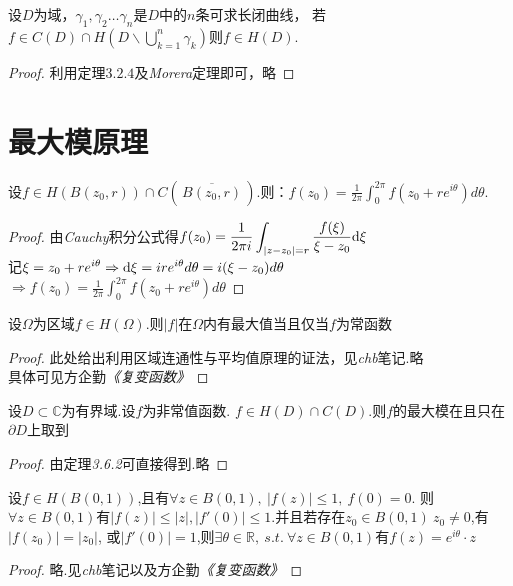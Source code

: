 \begin{eg}
	设$D$为域，$\gamma_1,\gamma_2\dots \gamma_n$是$D$中的$n$条可求长闭曲线，
	若$\displaystyle{f\in C(D)\cap H(D\backslash \mathop{\bigcup}\limits_{k=1}^{n}\gamma_k)}$则$f\in H(D)$.
\end{eg}
\begin{proof}
	利用定理$3.2.4$及\emph{Morera}定理即可，略
\end{proof}

\section{最大模原理}
\begin{mypro}[平均值定理]
	设$f\in H(B(z_0,r))\cap C(\,\overline{B(z_0,r)}\,)$.则：$\displaystyle{f(z_0)=\frac{1}{2\pi}\int_0^{2\pi}f(z_0+re^{i\theta})d\theta}$.
\end{mypro}
\begin{proof}
	由\emph{Cauchy}积分公式得$\displaystyle{f(z_0)=\frac{1}{2\pi i}\int_{|z-z_0|=r}\frac{f(\xi)}{\xi-z_0}\mathrm{d}\xi}$\\
	记$\displaystyle{\xi=z_0+re^{i\theta}\Rightarrow \mathrm{d}\xi=ire^{i\theta}d\theta=i(\xi-z_0)d\theta}$\\
	$\displaystyle{\Rightarrow f(z_0)=\frac{1}{2\pi}\int_0^{2\pi}f(z_0+re^{i\theta})d\theta}$
\end{proof}
\begin{mypro}[最大模定理]
	设$\Omega$为区域$f\in H(\Omega)$.则$|f|$在$\Omega$内有最大值当且仅当$f$为常函数
\end{mypro}
\begin{proof}
	此处给出利用区域连通性与平均值原理的证法，见\emph{chb}笔记.略\\
	具体可见方企勤\emph{《复变函数》}
\end{proof}

\begin{mypro}
	设$D\subset\mathbb{C}$为有界域.设$f$为非常值函数.
	$f\in H(D)\cap C(D)$.则$f$的最大模在且只在$\partial D$上取到
\end{mypro}
\begin{proof}
	由定理\emph{3.6.2}可直接得到.略
\end{proof}

\begin{mypro}[Schwarz引理]
	设$f\in H(B(0,1))$,且有$\forall z\in B(0,1),\ |f(z)|\leq1,\ f(0)=0$.
	则$\forall z\in B(0,1)$有$|f(z)|\leq|z|,|f'(0)|\leq1.$并且若存在$z_0\in B(0,1)\ z_0\neq 0$,有$|f(z_0)|=|z_0|$,
	或$|f'(0)|=1$,则$\exists\theta\in\mathbb{R},\ s.t.\ \forall z\in B(0,1)$有$f(z)=e^{i\theta}\cdot z$
\end{mypro}
\begin{proof}
	略.见\emph{chb}笔记以及方企勤\emph{《复变函数》}
\end{proof}

